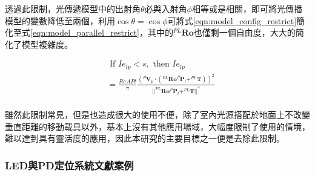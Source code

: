\begin{description}
        \qquad
        透過此限制，光傳遞模型中的出射角$\theta$必與入射角$\phi$相等或是相關，即可將光傳播模型的變數降低至兩個，利用$\cos\theta=\cos\phi$可將式\ref{eqn:model_config_restrict}簡化至式\ref{eqn:model_parallel_restrict}，其中的$^{PL}\boldsymbol{Ro}$也僅剩一個自由度，大大的簡化了模型複雜度。


        \begin{equation}
            \label{eqn:model_parallel_restrict}
            \begin{aligned}
                &\text { If } Ie_{lp}<s ,\text{ then }Ie_{lp} \\
                    &= \frac{ReAPt}{ \pi}
                \frac{
                        {( ^{P}\boldsymbol{V}_p \cdot 
                            (
                                ^{PL} \boldsymbol{Ro}^{P}\boldsymbol{P}_l
                                + ^{PL}\boldsymbol{T}
                            )
                        )}^2
                    } 
                    {
                        {
                            ||
                                ^{PL}\boldsymbol{Ro}^{P}\boldsymbol{P}_l+^{PL}\boldsymbol{T}
                            ||
                        }^{4}
                    }\\
            \end{aligned}
        \end{equation}

        \qquad
        雖然此限制常見，但是也造成很大的使用不便，除了室內光源搭配於地面上不改變垂直距離的移動載具以外，基本上沒有其他應用場域，大幅度限制了使用的情境，難以達到具有靈活度的應用，因此本研究的主要目標之一便是去除此限制。
    

    \end{description}
    






    \subsubsection{LED與PD定位系統文獻案例}
    \label{chp:LEDPD_case}

    

